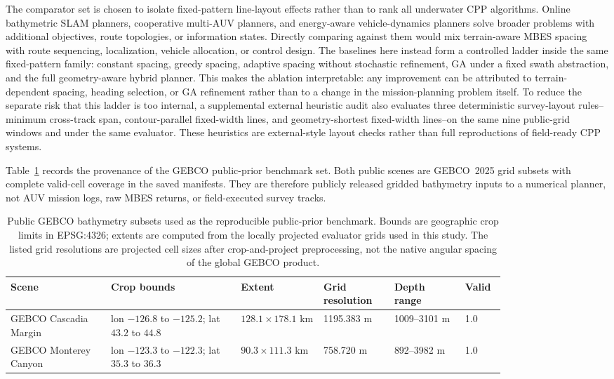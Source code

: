 \documentclass[jmse,article,submit,moreauthors]{Definitions/mdpi}
\begin{document}
The comparator set is chosen to isolate fixed-pattern line-layout effects rather than to rank all underwater CPP algorithms. Online bathymetric SLAM planners, cooperative multi-AUV planners, and energy-aware vehicle-dynamics planners solve broader problems with additional objectives, route topologies, or information states. Directly comparing against them would mix terrain-aware MBES spacing with route sequencing, localization, vehicle allocation, or control design. The baselines here instead form a controlled ladder inside the same fixed-pattern family: constant spacing, greedy spacing, adaptive spacing without stochastic refinement, GA under a fixed swath abstraction, and the full geometry-aware hybrid planner. This makes the ablation interpretable: any improvement can be attributed to terrain-dependent spacing, heading selection, or GA refinement rather than to a change in the mission-planning problem itself. To reduce the separate risk that this ladder is too internal, a supplemental external heuristic audit also evaluates three deterministic survey-layout rules--minimum cross-track span, contour-parallel fixed-width lines, and geometry-shortest fixed-width lines--on the same nine public-grid windows and under the same evaluator. These heuristics are external-style layout checks rather than full reproductions of field-ready CPP systems.

Table~\ref{tab:public_provenance} records the provenance of the GEBCO public-prior benchmark set. Both public scenes are GEBCO~2025 grid subsets with complete valid-cell coverage in the saved manifests. They are therefore publicly released gridded bathymetry inputs to a numerical planner, not AUV mission logs, raw MBES returns, or field-executed survey tracks.

\begin{table}[!htbp]
	\centering
		\caption{Public GEBCO bathymetry subsets used as the reproducible public-prior benchmark. Bounds are geographic crop limits in EPSG:4326; extents are computed from the locally projected evaluator grids used in this study. The listed grid resolutions are projected cell sizes after crop-and-project preprocessing, not the native angular spacing of the global GEBCO product.}
	\label{tab:public_provenance}
	\scriptsize
	\renewcommand{\arraystretch}{1.12}
	\setlength{\tabcolsep}{2.2pt}
	\begin{tabular}{@{}p{0.17\linewidth}p{0.22\linewidth}p{0.14\linewidth}p{0.12\linewidth}p{0.12\linewidth}p{0.05\linewidth}@{}}
		\toprule[1bp]
		\textbf{Scene} & \textbf{Crop bounds} & \textbf{Extent} & \textbf{Grid resolution} & \textbf{Depth range} & \textbf{Valid} \\
		\midrule[1bp]
		GEBCO Cascadia Margin & lon $-126.8$ to $-125.2$; lat $43.2$ to $44.8$ & $128.1 \times 178.1$ km & 1195.383 m & 1009--3101 m & 1.0 \\
		GEBCO Monterey Canyon & lon $-123.3$ to $-122.3$; lat $35.3$ to $36.3$ & $90.3 \times 111.3$ km & 758.720 m & 892--3982 m & 1.0 \\
		\bottomrule[1bp]
	\end{tabular}
\end{table}
\end{document}
